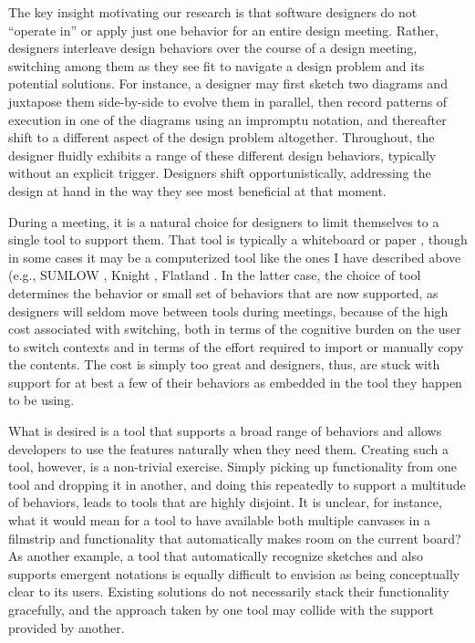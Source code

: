 \documentclass[12pt,fleqn]{ucithesis}
\begin{document}
The key insight motivating our research is that software designers do not ``operate in'' or apply just one behavior for an entire design meeting. Rather, designers interleave design behaviors over the course of a design meeting, switching among them as they see fit to navigate a design problem and its potential solutions. For instance, a designer may first sketch two diagrams and juxtapose them side-by-side to evolve them in parallel, then record patterns of execution in one of the diagrams using an impromptu notation, and thereafter shift to a different aspect of the design problem altogether. Throughout, the designer fluidly exhibits a range of these different design behaviors, typically without an explicit trigger. Designers shift opportunistically, addressing the design at hand in the way they see most beneficial at that moment.

During a meeting, it is a natural choice for designers to limit themselves to a single tool to support them. That tool is typically a whiteboard or paper \cite{petre2009insights}, though in some cases it may be a computerized tool like the ones I have described above (e.g., SUMLOW \cite{chen2008sumlow}, Knight \cite{damm2000tool}, Flatland \cite{mynatt1999flatland}. In the latter case, the choice of tool determines the behavior or small set of behaviors that are now supported, as designers will seldom move between tools during meetings, because of the high cost associated with switching, both in terms of the cognitive burden on the user to switch contexts and in terms of the effort required to import or manually copy the contents. The cost is simply too great and designers, thus, are stuck with support for at best a few of their behaviors as embedded in the tool they happen to be using.

What is desired is a tool that supports a broad range of behaviors and allows developers to use the features naturally when they need them. Creating such a tool, however, is a non-trivial exercise. Simply picking up functionality from one tool and dropping it in another, and doing this repeatedly to support a multitude of behaviors, leads to tools that are highly disjoint. It is unclear, for instance, what it would mean for a tool to have available both multiple canvases in a filmstrip and functionality that automatically makes room on the current board? As another example, a tool that automatically recognize sketches and also supports emergent notations is equally difficult to envision as being conceptually clear to its users. Existing solutions do not necessarily stack their functionality gracefully, and the approach taken by one tool may collide with the support provided by another.
\end{document}
